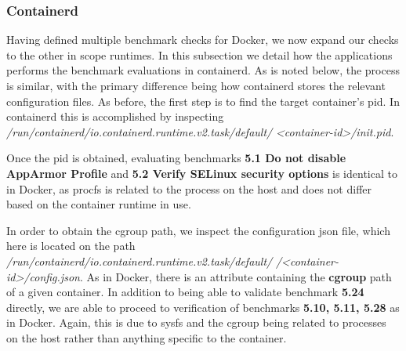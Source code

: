 \subsubsection*{Containerd}

Having defined multiple benchmark checks for Docker, we now expand our checks to the other in scope runtimes. In this subsection we detail how the applications performs the benchmark evaluations in containerd. As is noted below, the process is similar, with the primary difference being how containerd stores the relevant configuration files. As before, the first step is to find the target container's pid. In containerd this is accomplished by inspecting \textit{/run/containerd/io.containerd.runtime.v2.task/default/}
\textit{<container-id>/init.pid}.

Once the pid is obtained, evaluating benchmarks \textbf{5.1 Do not disable AppArmor Profile} and \textbf{5.2 Verify SELinux security options} is identical to in Docker, as procfs is related to the process on the host and does not differ based on the container runtime in use. 

In order to obtain the cgroup path, we inspect the configuration json file, which here is located on the path \textit{/run/containerd/io.containerd.runtime.v2.task/default/} \textit{/<container-id>/config.json}.
As in Docker, there is an attribute containing the \textbf{cgroup} path of a given container. In addition to being able to validate benchmark \textbf{5.24} directly, we are able to proceed to verification of benchmarks \textbf{5.10, 5.11, 5.28} as in Docker. Again, this is due to sysfs and the cgroup being related to processes on the host rather than anything specific to the container.
 